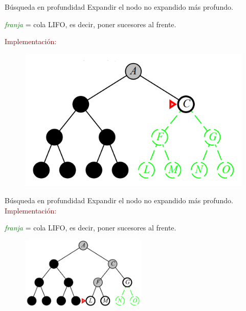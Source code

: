 \documentclass{beamer}
\theoremstyle{definition}
\theoremstyle{theorem}
\theoremstyle{remark}
\begin{document}

\begin{frame}{Búsqueda en profundidad}
    Expandir el nodo no expandido más profundo.\\
    \begin{center}
        \textit{\textcolor{Green}{franja}} = cola LIFO, es decir, poner sucesores al
        frente.\\
    \end{center}{}
    
    \textcolor{DarkRed}{Implementación:}
    \begin{figure}
        \includegraphics[scale=0.2]{51_chap3_pag51.png}
    \end{figure}
\end{frame}{}

\begin{frame}{Búsqueda en profundidad}
    Expandir el nodo no expandido más profundo.\\
    \textcolor{DarkRed}{Implementación:}
    \begin{center}
        \textit{\textcolor{Green}{franja}} = cola LIFO, es decir, poner sucesores al
        frente.\\
    \end{center}
    \begin{figure}
        \centering
        \includegraphics[width = 60mm, scale = 0.7]{53_image.PNG}
    \end{figure}
\end{frame}{}
\end{document}

